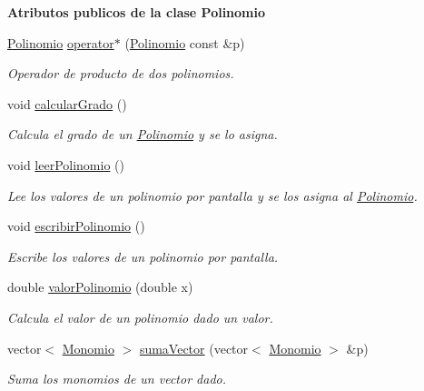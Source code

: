 \begin{Indent}{\bf Atributos publicos de la clase Polinomio}
\begin{DoxyCompactItemize}
\hyperlink{classed_1_1Polinomio}{Polinomio} \hyperlink{classed_1_1Polinomio_a547d6a82646d52dc7c950fef254c275c}{operator$\ast$} (\hyperlink{classed_1_1Polinomio}{Polinomio} const \&p)
\begin{DoxyCompactList}\small\item\em Operador de producto de dos polinomios. \end{DoxyCompactList}\item 
void \hyperlink{classed_1_1Polinomio_a7d264883d3fc0ba0b72c8c68fb55ca13}{calcular\-Grado} ()
\begin{DoxyCompactList}\small\item\em Calcula el grado de un \hyperlink{classed_1_1Polinomio}{Polinomio} y se lo asigna. \end{DoxyCompactList}\item 
void \hyperlink{classed_1_1Polinomio_ada80935d3e99914906c46592d6efdcd4}{leer\-Polinomio} ()
\begin{DoxyCompactList}\small\item\em Lee los valores de un polinomio por pantalla y se los asigna al \hyperlink{classed_1_1Polinomio}{Polinomio}. \end{DoxyCompactList}\item 
void \hyperlink{classed_1_1Polinomio_ad8c9a4ff8fd9253e42dfaa4a6ced9409}{escribir\-Polinomio} ()
\begin{DoxyCompactList}\small\item\em Escribe los valores de un polinomio por pantalla. \end{DoxyCompactList}\item 
double \hyperlink{classed_1_1Polinomio_ab2997b1a2b83727ac96fea969b69f3c7}{valor\-Polinomio} (double x)
\begin{DoxyCompactList}\small\item\em Calcula el valor de un polinomio dado un valor. \end{DoxyCompactList}\item 
vector$<$ \hyperlink{classed_1_1Monomio}{Monomio} $>$ \hyperlink{classed_1_1Polinomio_a58c42d9ddeaf9d4a3776af389809e2a9}{suma\-Vector} (vector$<$ \hyperlink{classed_1_1Monomio}{Monomio} $>$ \&p)
\begin{DoxyCompactList}\small\item\em Suma los monomios de un vector dado. \end{DoxyCompactList}\end{DoxyCompactItemize}
\end{Indent}
